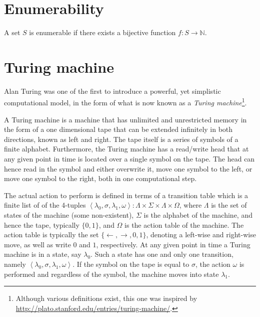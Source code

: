 

\section{Enumerability}

\begin{definition} A set $S$ is enumerable if there exists a bijective function
$f:S\longrightarrow \mathbb{N}$.\end{definition}

\section{Turing machine}\label{section:turing-machine}

Alan Turing was one of the first to introduce a powerful, yet simplistic
computational model, in the form of what is now known as a \emph{Turing
machine}\footnote{Although various definitions exist, this one was inspired by
\url{http://plato.stanford.edu/entries/turing-machine/}.}.

A Turing machine is a machine that has unlimited and unrestricted memory in the
form of a one dimensional tape that can be extended infinitely in both
directions, known as left and right. The tape itself is a series of symbols of
a finite alphabet.  Furthermore, the Turing machine has a read/write head that
at any given point in time is located over a single symbol on the tape. The
head can hence read in the symbol and either overwrite it, move one symbol to
the left, or move one symbol to the right, both in one computational step.

The actual action to perform is defined in terms of a transition table which is
a finite list of of the 4-tuples $\left\langle \lambda_0, \sigma, \lambda_1,
\omega \right\rangle : \Lambda \times \Sigma \times \Lambda \times \Omega$,
where $\Lambda$ is the set of states of the machine (some non-existent),
$\Sigma$ is the alphabet of the machine, and hence the tape, typically
$\{0,1\}$, and $\Omega$ is the action table of the machine. The action table is
typically the set $\{ \leftarrow, \rightarrow, 0, 1 \}$, denoting a left-wise
and right-wise move, as well as write $0$ and $1$, respectively. At any given
point in time a Turing machine is in a state, say $\lambda_0$. Such a state has
one and only one transition, namely $\left\langle \lambda_0, \sigma, \lambda_1,
\omega \right\rangle$. If the symbol on the tape is equal to $\sigma$, the
action $\omega$ is performed and regardless of the symbol, the machine moves
into state $\lambda_1$.

